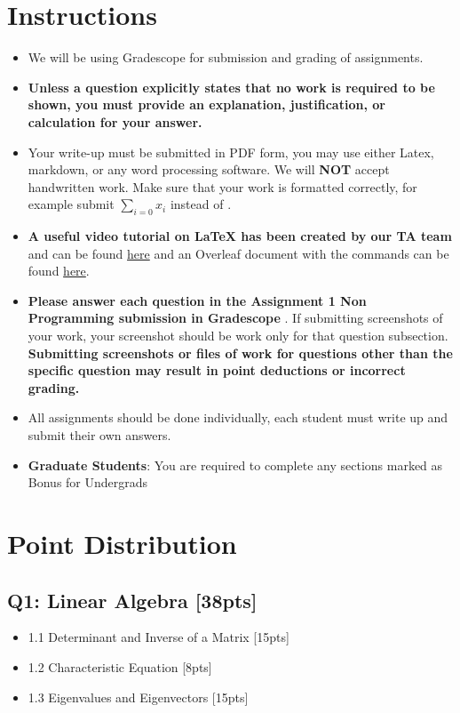 \documentclass{article}
\begin{document}
\section*{Instructions}
\begin{itemize}
    \item We will be using Gradescope for submission and grading of assignments. 
    \item \textbf{Unless a question explicitly states that no work is required to be shown, you must provide an explanation, justification, or calculation for your answer.}
    \item Your write-up must be submitted in PDF form, you may use either Latex,  markdown, or any word processing software. \color{red}We will \textbf{NOT} accept handwritten work. \color{black}Make sure that your work is formatted correctly, for example submit $\sum_{i=0} x_i$ instead of . 
    \item \textbf{A useful video tutorial on LaTeX has been created by our TA team} and can be found \href{https://www.dropbox.com/s/wywx114wtfoweru/Latex\%20Tutorial.mp4?dl=0}{here} and an Overleaf document with the commands can be found \href{https://www.overleaf.com/read/tmjnjqygqkqd}{here}.

    \item \color{red}\textbf{Please answer each question in the Assignment 1 Non Programming submission in Gradescope}\color{black}  . If submitting screenshots of your work, your screenshot should be work only for that question subsection. \textbf{Submitting screenshots or files of work for questions other than the specific question may result in point deductions or incorrect grading.}
    \item All assignments should be done individually, each student must write up and submit their own answers.
    \item \color{red}\textbf{Graduate Students}\color{black}: You are required to complete any sections marked as Bonus for Undergrads
\end{itemize}
\newpage

\section*{Point Distribution}
\subsection*{Q1: Linear Algebra [38pts]}
\begin{itemize}
    \item 1.1 Determinant and Inverse of a Matrix [15pts]
    \item 1.2 Characteristic Equation [8pts]
    \item 1.3 Eigenvalues and Eigenvectors [15pts]
\end{itemize}
\end{document}
